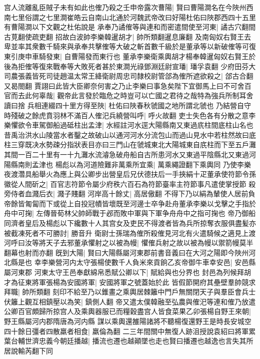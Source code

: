 宫人流離亂臣賊子未有如此也傕乃殺之壬申帝露次曹陽|{
	賢曰曹陽澗名在今陜州西南七里俗謂之七里澗崔皓云自南山北通於河魏武帝改曰好陽杜佑曰陜郡西四十五里有曹陽澗以下文觀之杜佑說是}
承奉乃譎傕等與連和而密遣間使至河東|{
	譎古穴翻間古莧翻使疏吏翻}
招故白波帥李樂韓暹胡才|{
	帥所類翻暹息廉翻}
及南匈奴右賢王去卑並率其衆數千騎來與承奉共擊傕等大破之斬首數千級於是董承等以新破傕等可復東引庚申車騎發東|{
	自曹陽發而東行也}
董承李樂衛乘輿胡才楊奉韓暹匈奴右賢王於後為拒傕等復來戰奉等大敗死者甚於東澗光祿鄧淵廷尉宣璠|{
	璠孚袁翻}
少府田芬大司農張義皆死司徒趙温太常王絳衛尉周忠司隸校尉管郃為傕所遮欲殺之|{
	郃古合翻又曷閤翻}
賈詡曰此皆大臣卿奈何害之乃止李樂曰事急矣陛下宜御馬上曰不可舍百官而去此何辜哉|{
	觀帝此言發於臨危之時豈可以亡國之君待之哉特為強兵所制耳舍讀曰捨}
兵相連綴四十里方得至陜|{
	杜佑曰陜春秋虢國之地所謂北虢也}
乃結營自守時殘破之餘虎賁羽林不滿百人傕汜兵繞營叫呼|{
	呼火故翻}
吏士失色各有分散之意李樂懼欲令車駕御船過砥柱出孟津|{
	水經註河水逕大陽縣南又東過㡳柱間底柱山名也昔禹治洪水山陵當水者鑿之故破山以通河河水分流包山而過山見水中若柱然故曰底柱三穿既决水勢疎分指狀表目亦曰三門山在虢城東北大陽城東自㡳柱而下至五戶灘其間一百二十里有一十九灘水流濬急破舟船自古所患河水又東過平陰縣北又東過河陽縣南則孟津也}
楊彪以為河道險難非萬乘所宜乘|{
	萬乘繩證翻下乘輿同}
乃使李樂夜渡濳具船舉火為應上與公卿步出營皇后兄伏德扶后一手挾絹十疋董承使符節令孫徽從人間斫之|{
	百官志符節令屬少府秩六百石為符節臺率主符節事凡遣使掌授節}
殺旁侍者血濺后衣|{
	濺子賤翻}
河岸高十餘丈|{
	高居傲翻}
不得下乃以絹為輦使人居前負帝餘皆匍匐而下或從上自投冠幘皆壞既至河邊士卒争赴舟董承李樂以戈擊之手指於舟中可掬|{
	左傳晉荀林父帥師戰于邲而敗中軍與下軍争舟舟中之指可掬也}
帝乃御船同濟者皇后及楊彪以下纔數十人其宫女及吏民不得渡者皆為兵所掠奪衣服俱盡髪亦被截凍死者不可勝討|{
	勝音升}
衛尉士孫瑞為傕所殺傕見河北有火遣騎候之適見上渡河呼曰汝等將天子去邪董承懼射之以被為幔|{
	懼傕兵射之故以被為幔以禦箭幔莫半翻幕也射而亦翻}
旣到大陽|{
	賢曰大陽縣屬河東郡前書音義曰在大河之陽即今陜州河北縣是也}
幸李樂營河内太守張楊使數千人負米來貢餉乙亥帝御牛車幸安邑|{
	安邑縣屬河東郡}
河東太守王邑奉獻綿帛悉賦公卿以下|{
	賦給與也分界也}
封邑為列候拜胡才為征東將軍張楊為安國將軍|{
	安國將軍之號蓋始於此}
皆假節開府其壘壁羣帥競求拜職|{
	帥所類翻}
刻印不給至乃以錐畫之乘輿居棘籬中門戶無關閉天子與羣臣會兵士伏籬上觀互相鎮壓以為笑|{
	鎮側人翻}
帝又遣太僕韓融至弘農與傕汜等連和傕乃放遣公卿百官頗歸所掠宫人及乘輿器服已而糧穀盡宫人皆食菜果乙卯張楊自野王來朝|{
	野王縣屬河内郡隋唐為河内縣}
謀以乘輿還雒陽諸將不聽楊復還野王是時長安城空四十餘日彊者四散羸者相食|{
	羸倫為翻}
二三年間關中無復人跡沮授說袁紹曰將軍累葉台輔世濟忠義今朝廷播越|{
	播流也遷也越顚墜也走也賢曰播遷也越逸也言失其所居說輸芮翻下同}
